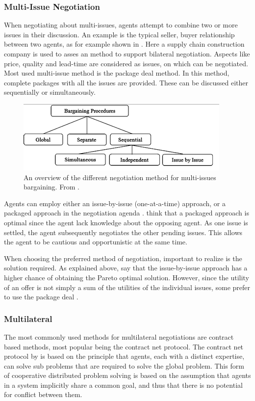 \subsubsection{Multi-Issue Negotiation}
 When negotiating about multi-issues, agents attempt to combine two or more issues in their discussion. An example is the typical seller, buyer relationship between two agents, as for example shown in \citep{schramm2013bilateral}. Here a supply chain construction company is used to asses an method to support bilateral negotiation. Aspects like price, quality and lead-time are considered as issues, on which can be negotiated. Most used multi-issue method is the package deal method. In this method, complete packages with all the issues are provided. These can be discussed either sequentially or simultaneously. 

 \begin{figure}[h]
 	\centering
 	\includegraphics[width=0.7\linewidth]{img/multi-lateral}
 	\caption{An overview of the different negotiation method for multi-issues bargaining. From \citep{abedin2014agenda}.}
 	\label{fig:multi-lateral}
 \end{figure}
 
 Agents can employ either an issue-by-issue (one-at-a-time) approach, or a packaged approach in the negotiation agenda \citep{fatima2004agenda}. \citet{abedin2014agenda} think that a packaged approach is optimal since the agent lack knowledge about the opposing agent. As one issue is settled, the agent subsequently negotiates the other pending issues. This allows the agent to be cautious and opportunistic at the same time.
 
 When choosing the preferred method of negotiation, important to realize is the solution required. As explained above, \citet{abedin2014agenda} say that the issue-by-issue approach has a higher chance of obtaining the Pareto optimal solution. However, since the utility of an offer is not simply a sum of the utilities of the individual issues, some prefer to use the package deal \citep{zheng2015automated}.

\subsubsection{Multilateral}
\label{sec:lit:neg:multilateral}
The most commonly used methods for multilateral negotiations are contract based methods, most popular being the contract net protocol. The contract net protocol by \citet{smith1980communication} is based on the principle that agents, each with a distinct expertise, can solve sub problems that are required to solve the global problem. This form of cooperative distributed problem solving is based on the assumption that agents in a system implicitly share a common goal, and thus that there is no potential for conflict between them.

